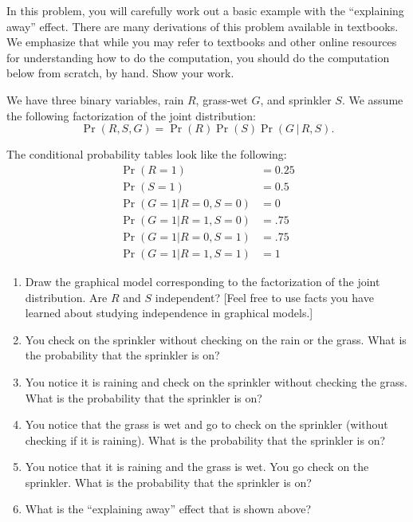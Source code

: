 \documentclass[submit]{harvardml}
\begin{document}
\begin{problem}

  In this problem, you will carefully work out a basic example with
  the ``explaining away'' effect. There are many derivations of this
  problem available in textbooks. We emphasize that while you may
  refer to textbooks and other online resources for understanding how
  to do the computation, you should do the computation below from
  scratch, by hand.  Show your work.

  We have three binary variables, rain $R$, grass-wet $G$, and
  sprinkler $S$.
We  assume the following factorization of the joint distribution:
$$
\Pr(R,S,G) = \Pr(R)\Pr(S)\Pr(G\, |\, R, S).
  $$
  
  The conditional probability tables look like the
  following:
  \begin{eqnarray*}
    \Pr(R = 1) &= 0.25 \\
    \Pr(S = 1) &= 0.5 \\
    \Pr(G = 1 | R = 0 , S = 0 ) &= 0 \\
    \Pr(G = 1 | R = 1 , S = 0 ) &= .75 \\
    \Pr(G = 1 | R = 0 , S = 1 ) &= .75 \\
    \Pr(G = 1 | R = 1 , S = 1 ) &= 1
  \end{eqnarray*}
  
 
  \begin{enumerate}
    \item Draw the graphical model corresponding to the
      factorization of the joint distribution. Are $R$ and $S$ independent? [Feel free to use
      facts you have learned about studying independence in graphical models.]
    \item You check on the sprinkler without checking on the rain or
      the grass. What is the probability that the sprinkler is on?
    \item You notice it is raining and check on the sprinkler without
      checking the grass.  What is the probability that the sprinkler is on?
    \item You notice that the grass is wet and go to check on the
      sprinkler (without checking if it is raining).  What is the
      probability that the sprinkler is on?
    \item You notice that it is raining and the grass is wet.  You go
      check on the sprinkler.  What is the probability that the sprinkler is on?
    \item What is the ``explaining away'' effect that is shown above?
    \end{enumerate}

\end{problem}
\end{document}
